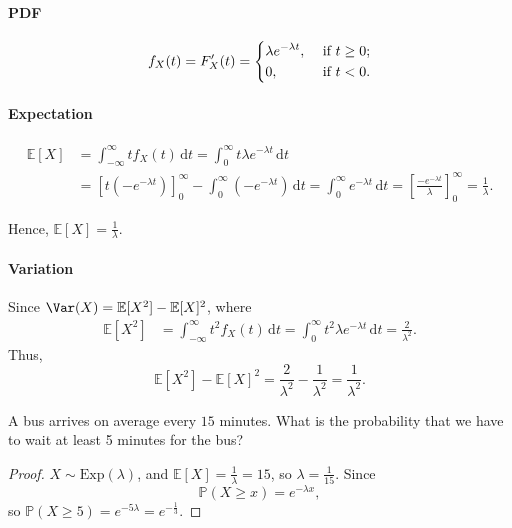 \paragraph{PDF}
\[
    f_X(t) = F_X^{\prime} (t) = \begin{dcases}
        \lambda e^{-\lambda t}, &\text{ if } t \ge 0 ;\\
        0, &\text{ if } t < 0.
    \end{dcases}
\]

\paragraph{Expectation}
\begin{align*}
    \mathbb{E} [X] &= \int _{-\infty }^{\infty } t f_X(t) \, \mathrm{d} t = \int _0^{\infty} t \lambda e^{-\lambda t} \, \mathrm{d} t \\
    &= [t(-e^{-\lambda t})]_0^{\infty} - \int _0^{\infty} (-e^{-\lambda t})\, \mathrm{d} t = \int _0^{\infty } e^{-\lambda t} \, \mathrm{d} t = \left[ \frac{-e^{-\lambda t}}{\lambda } \right]_0^{\infty} = \frac{1}{\lambda}.     
\end{align*}

Hence, \(\mathbb{E} [X] = \frac{1}{\lambda}\). 

\paragraph{Variation}
Since \(\Var(X) = \mathbb{E} [X^2] - \mathbb{E} [X]^2\), where 
\begin{align*}
    \mathbb{E} [X^2] &= \int _{-\infty }^{\infty} t^2 f_X(t) \, \mathrm{d} t = \int _0^{\infty } t^2 \lambda e^{-\lambda t} \, \mathrm{d} t = \frac{2}{\lambda ^2}.  
\end{align*} 
Thus,
\[
    \mathbb{E} [X^2] - \mathbb{E} [X]^2 = \frac{2}{\lambda ^2} - \frac{1}{\lambda^2} = \frac{1}{\lambda ^2}.
\]


\begin{eg}
    A bus arrives on average every \(15\) minutes. What is the probability that we have to wait at least 5 minutes for the bus? 
\end{eg}
\begin{proof}
    \(X \sim \mathrm{Exp}(\lambda) \), and \(\mathbb{E} [X] = \frac{1}{\lambda} = 15\), so \(\lambda = \frac{1}{15}\). Since 
    \[
        \mathbb{P} (X \ge x) = e^{-\lambda x},
    \]   
    so \(\mathbb{P} (X \ge 5) = e^{-5 \lambda } = e^{-\frac{1}{3}}\). 
\end{proof}

